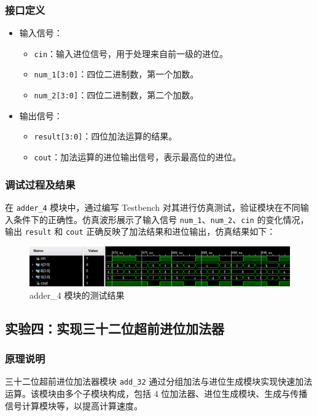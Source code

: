 \documentclass[zihao=5, UTF8]{article}
\theoremstyle{MyLineTheoremStyle} %
\theoremstyle{MyBlockTheoremStyle} %
\theoremstyle{MySubsubsectionStyle} %
\begin{document}
\subsubsection{接口定义}
\begin{itemize}
    \item 输入信号：
    \begin{itemize}
        \item \texttt{cin}：输入进位信号，用于处理来自前一级的进位。
        \item \texttt{num\_1[3:0]}：四位二进制数，第一个加数。
        \item \texttt{num\_2[3:0]}：四位二进制数，第二个加数。
    \end{itemize}
    \item 输出信号：
    \begin{itemize}
        \item \texttt{result[3:0]}：四位加法运算的结果。
        \item \texttt{cout}：加法运算的进位输出信号，表示最高位的进位。
    \end{itemize}
\end{itemize}

\subsubsection{调试过程及结果}
在 \texttt{adder\_4} 模块中，通过编写 Testbench 对其进行仿真测试，验证模块在不同输入条件下的正确性。仿真波形展示了输入信号 \texttt{num\_1}、\texttt{num\_2}、\texttt{cin} 的变化情况，输出 \texttt{result} 和 \texttt{cout} 正确反映了加法结果和进位输出，仿真结果如下：
\begin{figure}[htbp]
    \centering
    \includegraphics[width=\textwidth]{adder_4.png} %
    \caption{adder\_4 模块的测试结果}
    \label{fig:adder_4模块的测试结果}
\end{figure}

\subsection{实验四：实现三十二位超前进位加法器}
\subsubsection{原理说明}
三十二位超前进位加法器模块 \texttt{add\_32} 通过分组加法与进位生成模块实现快速加法运算。该模块由多个子模块构成，包括 4 位加法器、进位生成模块、生成与传播信号计算模块等，以提高计算速度。
\end{document}
